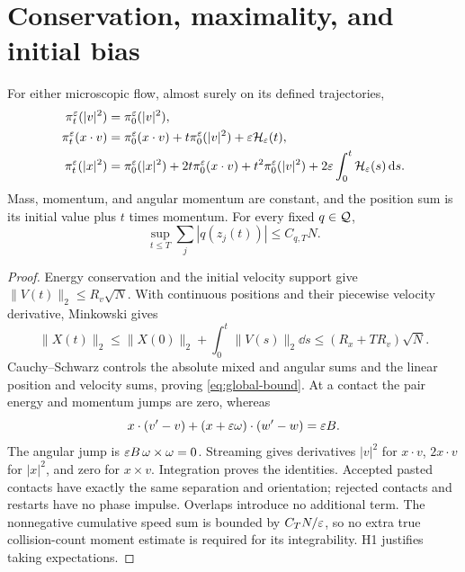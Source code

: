 \section{Conservation, maximality, and initial bias}\label{sec:mechanics}
\begin{lemma}
\label{lem:mechanics}
For either microscopic flow, almost surely on its defined trajectories,
\begin{align}
 \pi_t^\varepsilon(|v|^2)&=\pi_0^\varepsilon(|v|^2),\label{eq:energy}\\
 \pi_t^\varepsilon(x\cdot v)&=\pi_0^\varepsilon(x\cdot v)+t\pi_0^\varepsilon(|v|^2)
                                  +\varepsilon\mathcal H_\varepsilon(t),\label{eq:virial}\\
 \pi_t^\varepsilon(|x|^2)&=\pi_0^\varepsilon(|x|^2)+2t\pi_0^\varepsilon(x\cdot v)
       +t^2\pi_0^\varepsilon(|v|^2)+2\varepsilon\int_0^t\mathcal H_\varepsilon(s)\,\mathrm d s.
 \label{eq:spread}
\end{align}
Mass, momentum, and angular momentum are constant, and the position sum is
its initial value plus $t$ times momentum. For every fixed $q\in\mathcal Q$,
\begin{equation}\label{eq:global-bound}
 \sup_{t\le T}\sum_j|q(z_j(t))|\le C_{q,T}N.
\end{equation}
\end{lemma}
\begin{proof}
Energy conservation and the initial velocity support give
$\|V(t)\|_2\le R_v\sqrt N$. With continuous positions and their piecewise
velocity derivative, Minkowski gives
\[
 \|X(t)\|_2\le\|X(0)\|_2+\int_0^t\|V(s)\|_2\dd s
                           \le(R_x+TR_v)\sqrt N.
\]
Cauchy--Schwarz controls the absolute mixed and angular sums and the linear
position and velocity sums, proving \eqref{eq:global-bound}.
At a contact the pair energy and momentum jumps are zero, whereas
\[
 x\cdot(v'-v)+(x+\varepsilon\omega)\cdot(w'-w)=\varepsilon B.
\]
The angular jump is $\varepsilon B\,\omega\times\omega=0$.
Streaming gives derivatives $|v|^2$ for $x\cdot v$, $2x\cdot v$ for
$|x|^2$, and zero for $x\times v$. Integration proves the identities.
Accepted pasted contacts have exactly the same separation and orientation;
rejected contacts and restarts have no phase impulse. Overlaps introduce
no additional term. The nonnegative cumulative speed sum is bounded by $C_TN/\varepsilon$,
so no extra true collision-count moment estimate is required for its
integrability. H1 justifies taking expectations.
\end{proof}

